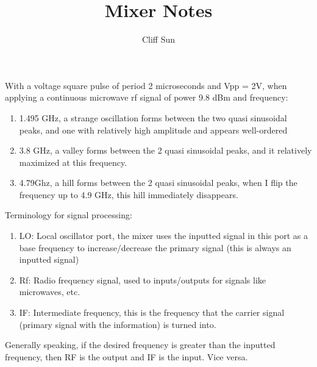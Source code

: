 \documentclass{article}
\title{Mixer Notes}
\author{Cliff Sun}
\begin{document}
\maketitle

With a voltage square pulse of period 2 microseconds and Vpp = 2V, when applying a continuous microwave rf signal of power 9.8 dBm and frequency:

\begin{enumerate}
    \item 1.495 GHz, a strange oscillation forms between the two quasi sinusoidal peaks, and one with relatively high amplitude and appears well-ordered
    \item 3.8 GHz, a valley forms between the 2 quasi sinusoidal peaks, and it relatively maximized at this frequency. 
    \item 4.79Ghz, a hill forms between the 2 quasi sinusoidal peaks, when I flip the frequency up to 4.9 GHz, this hill immediately disappears.
\end{enumerate}

Terminology for signal processing:

\begin{enumerate}
    \item LO: Local oscillator port, the mixer uses the inputted signal in this port as a base frequency to increase/decrease the primary signal (this is always an inputted signal)
    \item Rf: Radio frequency signal, used to inputs/outputs for signals like microwaves, etc.
    \item IF: Intermediate frequency, this is the frequency that the carrier signal (primary signal with the information) is turned into. 
\end{enumerate}

Generally speaking, if the desired frequency is greater than the inputted frequency, then RF is the output and IF is the input. Vice versa.
\end{document}
